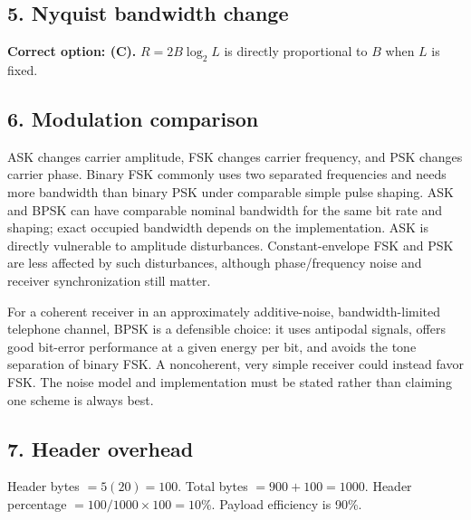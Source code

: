 \documentclass[11pt,a4paper]{article}
\begin{document}
\noindent\begin{minipage}{\linewidth}\subsection*{5. Nyquist bandwidth change}
\textbf{Correct option: (C).} $R=2B\log_2L$ is directly proportional to $B$ when $L$ is fixed.
\end{minipage}\par\medskip
\noindent\begin{minipage}{\linewidth}\subsection*{6. Modulation comparison}

ASK changes carrier amplitude, FSK changes carrier frequency, and PSK changes carrier phase. Binary FSK commonly uses two separated frequencies and needs more bandwidth than binary PSK under comparable simple pulse shaping. ASK and BPSK can have comparable nominal bandwidth for the same bit rate and shaping; exact occupied bandwidth depends on the implementation. ASK is directly vulnerable to amplitude disturbances. Constant-envelope FSK and PSK are less affected by such disturbances, although phase/frequency noise and receiver synchronization still matter.

For a coherent receiver in an approximately additive-noise, bandwidth-limited telephone channel, BPSK is a defensible choice: it uses antipodal signals, offers good bit-error performance at a given energy per bit, and avoids the tone separation of binary FSK. A noncoherent, very simple receiver could instead favor FSK. The noise model and implementation must be stated rather than claiming one scheme is always best.
\end{minipage}\par\medskip
\noindent\begin{minipage}{\linewidth}\subsection*{7. Header overhead}

Header bytes $=5(20)=100$. Total bytes $=900+100=\boxed{1000}$.
Header percentage $=100/1000\times100=\boxed{10\%}$. Payload efficiency is 90\%.
\end{minipage}\par\medskip
\end{document}
